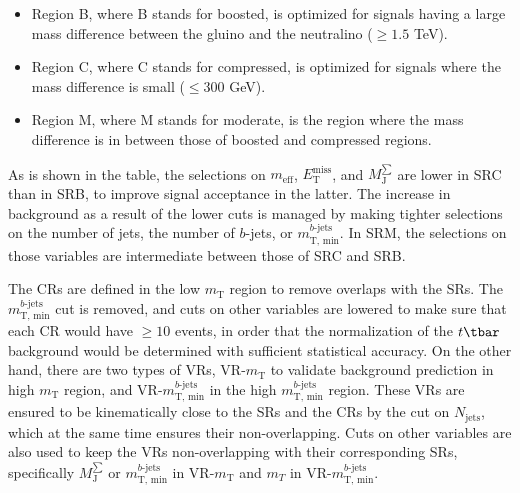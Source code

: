 \begin{itemize}

	\item Region B, where B stands for boosted, is optimized for signals having a
	      large mass difference between the gluino and the neutralino ($\geq 1.5$ TeV).

	\item Region C, where C stands for compressed, is optimized for signals where
	      the mass difference is small ($\leq 300$ GeV).

	\item Region M, where M stands for moderate, is the region where the mass
	      difference is in between those of boosted and compressed regions.

\end{itemize}

As is shown in the table, the selections on $m_{\text{eff}}$,
$E_{\text{T}}^{\text{miss}}$, and $M_{\text{J}}^{\sum}$ are lower in SRC than in
SRB, to improve signal acceptance in the latter. The increase in background as a
result of the lower cuts is managed by making tighter selections on the number
of jets, the number of $b$-jets, or $m_{\text{T, min}}^{b\text{-jets}}$. In
SRM, the selections on those variables are intermediate between those of SRC and
SRB.

The CRs are defined in the low $m_{\text{T}}$ region to remove overlaps with
the SRs. The $m_{\text{T, min}}^{b\text{-jets}}$ cut is removed, and cuts on
other variables are lowered to make sure that each CR would have $\geq 10$
events, in order that the normalization of the $t\tbar$ background would be
determined with sufficient statistical accuracy. On the other hand, there are
two types of VRs, VR-$m_{\text{T}}$ to validate background prediction in high
$m_{\text{T}}$ region, and VR-$m_{\text{T, min}}^{b\text{-jets}}$ in the high
$m_{\text{T, min}}^{b\text{-jets}}$ region. These VRs are ensured to be
kinematically close to the SRs and the CRs by the cut on $N_{\text{jets}}$,
which at the same time ensures their non-overlapping. Cuts on other variables
are also used to keep the VRs non-overlapping with their corresponding SRs,
specifically $M_{\text{J}}^{\sum}$ or $m_{\text{T, min}}^{b\text{-jets}}$ in
VR-$m_{\text{T}}$ and $m_T$ in VR-$m_{\text{T, min}}^{b\text{-jets}}$.

